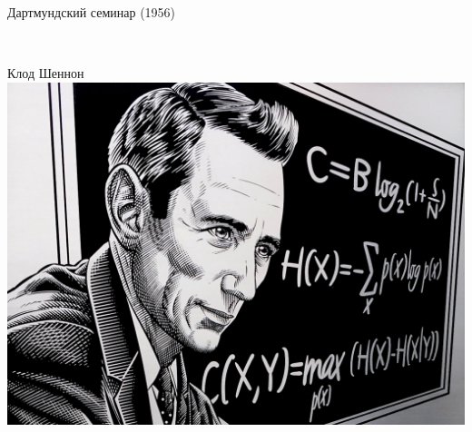 \documentclass[notes,12pt, aspectratio=169]{beamer}
\begin{document}
\begin{frame}{Дартмундский семинар (1956)}
\begin{columns}[T]
\begin{column}{.48\textwidth}
		\mbox{} \\		
		 \color{blue} Клод Шеннон \\
		\includegraphics[scale=0.1]{shennon.jpeg}\\
	\end{column}%
\end{columns}
\end{frame}

{
\begin{frame}
\end{frame}
}
\end{document}
